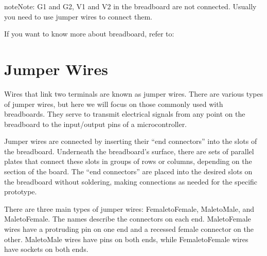 \documentclass[a4paper,11pt,english]{sphinxmanual}
\let\sphinxpxdimen\pdfpxdimen\else\newdimen\sphinxpxdimen
\begin{document}
\noindent\sphinxincludegraphics[width=600\sphinxpxdimen]{{breadboard_internal}.png}

\begin{sphinxadmonition}{note}{Note:}
\sphinxAtStartPar
G1 and G2, V1 and V2 in the breadboard are not connected. Usually you need to use jumper wires to connect them.
\end{sphinxadmonition}


\sphinxAtStartPar
If you want to know more about breadboard, refer to: 

\sphinxstepscope


\section{Jumper Wires}
\label{\detokenize{Components_Kit/component_wires:jumper-wires}}\label{\detokenize{Components_Kit/component_wires:cpn-wires}}\label{\detokenize{Components_Kit/component_wires::doc}}
\sphinxAtStartPar
Wires that link two terminals are known as jumper wires. There are various types of jumper wires, but here we will focus on those commonly used with breadboards. They serve to transmit electrical signals from any point on the breadboard to the input/output pins of a microcontroller.

\sphinxAtStartPar
Jumper wires are connected by inserting their “end connectors” into the slots of the breadboard. Underneath the breadboard’s surface, there are sets of parallel plates that connect these slots in groups of rows or columns, depending on the section of the board. The “end connectors” are placed into the desired slots on the breadboard without soldering, making connections as needed for the specific prototype.

\sphinxAtStartPar
There are three main types of jumper wires: Female\sphinxhyphen{}to\sphinxhyphen{}Female, Male\sphinxhyphen{}to\sphinxhyphen{}Male, and Male\sphinxhyphen{}to\sphinxhyphen{}Female. The names describe the connectors on each end. Male\sphinxhyphen{}to\sphinxhyphen{}Female wires have a protruding pin on one end and a recessed female connector on the other. Male\sphinxhyphen{}to\sphinxhyphen{}Male wires have pins on both ends, while Female\sphinxhyphen{}to\sphinxhyphen{}Female wires have sockets on both ends.
\end{document}
